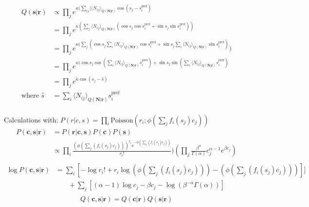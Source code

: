 \documentclass[12pt]{article}
\begin{document}
\begin{equation}
\begin{aligned}
Q(\mathbf{s|r}) &\propto \prod_j e^{\kappa(\sum_{ij} [\langle N_{ij} \rangle_{Q(\mathbf{N|r})} \cos(s_j - s_i^{\text{pref}})}\\
&= \prod_j e^{\kappa(\sum_{j} \langle N_{ij} \rangle_{Q(\mathbf{N|r})} (\cos s_j \cos s_i^{\text{pref}} + \sin s_j \sin s_i^{\text{pref}}))}\\
&= \prod_j e^{\kappa(\sum_j (\cos s_j \sum_i \langle N_{ij} \rangle_{Q(\mathbf{N|r})} \cos s_i^{\text{pref}} + \sin s_j \sum_i \langle N_{ij} \rangle_{Q(\mathbf{N|r})} \sin s_i^{\text{pref}})})\\
&= \prod_j e^{\kappa(\cos s_j \cos(\sum_i \langle N_{ij} \rangle_{Q(\mathbf{N|r})} s_i^{\text{pref}}) + \sin s_j \sin(\sum_i \langle N_{ij} \rangle_{Q(\mathbf{N|r})} s_i^{\text{pref}})}\\
&= \prod_j e^{\tilde{\kappa} \cos(s_j - \hat{s})}\\
\text{where } \hat{s} &= \sum_i \langle N_{ij} \rangle_{Q(\mathbf{N|r})} s_i^{\text{pref}}
\end{aligned}
\end{equation}
\\
Calculations with:
$P(r|c, s) = \prod_i \text{Poisson}(r_i; \phi(\sum_j f_i(s_j)c_j))$\\
\begin{equation}
\begin{aligned}
P(\mathbf{c, s|r}) & = P(\mathbf{r|c, s}) P(\mathbf{c}) P(\mathbf{s})\\
&\propto \prod_i\frac{(\phi(\sum_j(f_i(s_j)c_j)))^{r_i} e^{-\phi(\sum_j(f_i(s_j)c_j))}}{r_i!}) (\prod_j \frac{\beta^{\alpha}}{\Gamma(\alpha)} c_j^{\alpha - 1}e^{\beta c_j})\\
\end{aligned}
\end{equation}
\begin{equation}
\begin{aligned}
\log P(\mathbf{c, s| r}) &= \sum_i [- \log r_i! + r_i \log(\phi(\sum_j(f_i(s_j)c_j))) - (\phi(\sum_j(f_i(s_j)c_j)))]]\\
& \phantom{{}=1} + \sum_j[(\alpha - 1) \log c_j - \beta c_j - \log (\beta^{- \alpha} \Gamma (\alpha))]\\
\end{aligned}
\end{equation}
\begin{equation}
Q(\mathbf{c, s|r}) = Q(\mathbf{c|r}) Q(\mathbf{s|r})
\end{equation}
\end{document}
